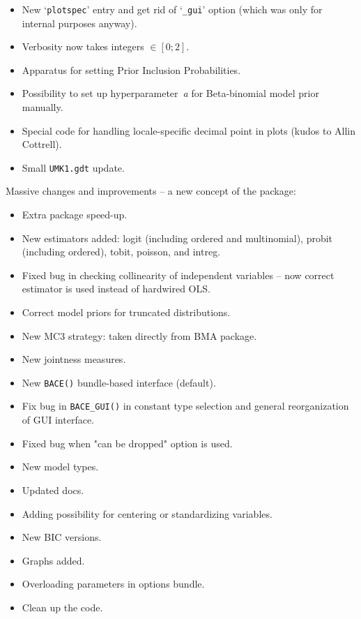 \documentclass[a4paper]{BACE}
\begin{document}
\begin{description}
\begin{itemize}[label={--}]
				\item New `\texttt{plotspec}' entry and get rid of
					`\texttt{\_gui}' option (which was only for
					internal purposes anyway).
				\item Verbosity now takes integers $\in [0;2]$.
				\item Apparatus for setting Prior Inclusion Probabilities.
				\item Possibility to set up hyperparameter~\textit{a}
					for Beta-binomial model prior manually.
				\item Special code for handling locale-specific decimal
					point in plots (kudos to Allin Cottrell).
				\item Small \texttt{UMK1.gdt} update.
			\end{itemize}
		\item[3.0] Massive changes and improvements --
			a new concept of the package:
			\begin{itemize}[label={--}]
				\item Extra package speed-up.
				\item New estimators added: logit (including ordered
					and multinomial), probit (including ordered),
					tobit, poisson, and intreg.
				\item Fixed bug in checking collinearity of
					independent variables -- now correct estimator
					is used instead of hardwired OLS.
				\item Correct model priors for truncated distributions.
				\item New MC3 strategy: taken directly from BMA package.
				\item New jointness measures.
				\item New \texttt{BACE()} bundle-based interface (default).
				\item Fix bug in \texttt{BACE\_GUI()} in constant type
					selection and general reorganization of GUI interface.
				\item Fixed bug when "can be dropped" option is used.
				\item New model types.
				\item Updated docs.
				\item Adding possibility for centering or standardizing variables.
				\item New BIC versions.
				\item Graphs added.
				\item Overloading parameters in options bundle.
				\item Clean up the code.
			\end{itemize}

\end{description}
\end{document}
